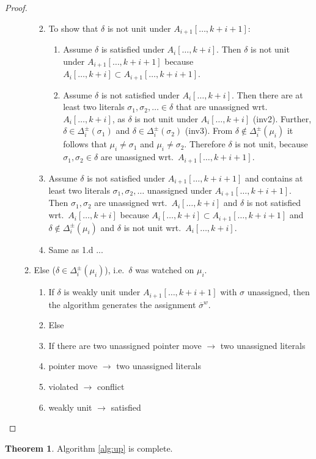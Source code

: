 \documentclass{vutinfth} %
\theoremstyle{example}
\theoremstyle{definition}
\theoremstyle{theorem}
\newtheorem{theorem}{Theorem}[section]
\theoremstyle{lemma}
\theoremstyle{corollary}
\newcommand{\negweak}[1]{\overline{#1}^w}
\newcommand{\ass}{A}
\newcommand{\fabef}{\ass_{i}}
\newcommand{\faaf}{\ass_{i + 1}}
\newcommand{\abef}{\fabef[\ldots, k + i]}
\newcommand{\aaf}{\faaf[\ldots, k + i + 1]}
\newcommand{\dbef}{\Delta_{i}}
\newcommand{\sgl}{\mu}
\newcommand{\bsgl}{\sigma}
\begin{document}
\begin{proof}
\begin{enumerate}
\begin{enumerate}
\begin{enumerate}
\begin{enumerate}
\end{enumerate}
\item To show that $\delta$ is not unit under $\aaf$:
\begin{enumerate}
\item Assume $\delta$ is satisfied under $\abef$. Then $\delta$ is not unit under $\aaf$ because $\abef \subset \aaf$.
\item Assume $\delta$ is not satisfied under $\abef$. Then there are at least two literals $\bsgl_1, \bsgl_2, \ldots \in \delta$ that are unassigned wrt.~$\abef$, as $\delta$ is not unit under $\abef$ (inv2). Further, $\delta \in \dbef^\pm(\bsgl_1)$ and $\delta \in \dbef^\pm(\bsgl_2)$ (inv3). From $\delta \not \in \dbef^\pm(\sgl_i)$ it follows that $\sgl_i \not = \bsgl_1$ and $\sgl_i \not = \bsgl_2$. %
Therefore $\delta$ is not unit, because $\bsgl_1, \bsgl_2 \in \delta$ are unassigned wrt.~$\aaf$.
\end{enumerate}
\item Assume $\delta$ is not satisfied under $\aaf$ and contains at least two literals $\bsgl_1, \bsgl_2, \ldots$ unassigned under $\aaf$. Then $\bsgl_1, \bsgl_2$ are unassigned wrt.~$\abef$ and $\delta$ is not satisfied wrt.~$\abef$ because $\abef \subset \aaf$ and $\delta \not \in \dbef^\pm(\sgl_i)$ and $\delta$ is not unit wrt.~$\abef$.
\item Same as 1.d ...
\end{enumerate}
\item Else ($\delta \in \dbef^\pm(\sgl_i)$), i.e.~$\delta$ was watched on $\sgl_i$.
\begin{enumerate}
\item If $\delta$ is weakly unit under $\aaf$ with $\bsgl$ unassigned, then the algorithm generates the assignment $\negweak{\bsgl}$.
\item Else
\item If there are two unassigned pointer move $\to$ two unassigned literals
\item pointer move $\to$ two unassigned literals
\item violated $\to$ conflict
\item weakly unit $\to$ satisfied
\end{enumerate}
\end{enumerate}
\end{enumerate}
\end{proof}

\begin{theorem}
Algorithm \ref{alg:up} is complete.
\end{theorem}
\end{document}
